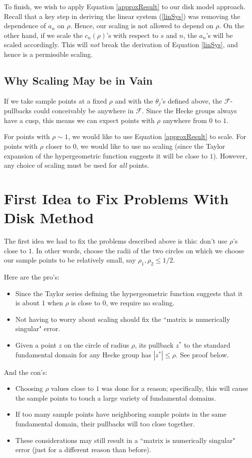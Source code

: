 \documentclass[]{article}
\begin{document}
To finish, we wish to apply Equation \ref{approxResult} to our disk model approach.
Recall that a key step in deriving the linear system (\ref{linSys}) was removing the dependence of $a_n$ on $\rho$.
Hence, our scaling is not allowed to depend on $\rho$.
On the other hand, if we scale the $c_n(\rho)$'s with respect to $s$ and $n$, the $a_n$'s will be scaled accordingly.
This will \textit{not} break the derivation of Equation \ref{linSys}, and hence is a permissible scaling.

\subsection{Why Scaling May be in Vain}

If we take sample points at a fixed $\rho$ and with the $\theta_j$'s defined above, the $\mathcal{F}$-pullbacks could conceivably be anywhere in $\mathcal{F}$.
Since the Hecke groups always have a cusp, this means we can expect points with $\rho$ anywhere from $0$ to $1$.

For points with $\rho \sim 1$, we would like to use Equation \ref{approxResult} to scale.
For points with $\rho$ closer to $0$, we would like to use no scaling (since the Taylor expansion of the hypergeometric function suggests it will be close to $1$).
However, any choice of scaling must be used for \textit{all} points.

\section{First Idea to Fix Problems With Disk Method}\label{fix1}

The first idea we had to fix the problems described above is this: don't use $\rho$'s close to $1$.
In other words, choose the radii of the two circles on which we choose our sample points to be relatively small, say $\rho_1, \rho_2 \leq 1/2$.

Here are the pro's:
\begin{itemize}
	\item Since the Taylor series defining the hypergeometric function suggests that it is about $1$ when $\rho$ is close to $0$, we require no scaling.
	\item Not having to worry about scaling should fix the ``matrix is numerically singular" error.
	\item Given a point $z$ on the circle of radius $\rho$, its pullback $z^*$ to the standard fundamental domain for any Hecke group has $|z^*| \leq \rho$.
	See proof below.
\end{itemize}
And the con's:
\begin{itemize}
	\item Choosing $\rho$ values close to $1$ was done for a reason; specifically, this will cause the sample points to touch a large variety of fundamental domains.
	\item If too many sample points have neighboring sample points in the same fundamental domain, their pullbacks will too close together.
	\item These considerations may still result in a ``matrix is numerically singular" error (just for a different reason than before).
\end{itemize}
\end{document}
